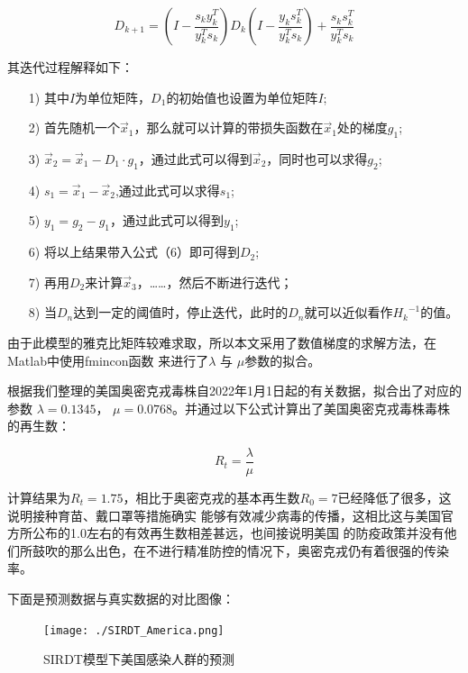 \documentclass[bwprint]{gmcmthesis}
\numberwithin{figure}{section}
\begin{document}
\begin{equation} \label{}
    D_{k+1}=\left( I-\frac{s_ky_{k}^{T}}{y_{k}^{T}s_k} \right) D_k\left( I-\dfrac{y_ks_{k}^{T}}{y_{k}^{T}s_k} \right) +\dfrac{s_ks_{k}^{T}}{y_{k}^{T}s_k}
\end{equation}

\par 其迭代过程解释如下：

\begin{itemize}
    \item[1)] 其中$I$为单位矩阵，$D_1$的初始值也设置为单位矩阵$I$;
    \item[2)] 首先随机一个$\vec{x}_1$，那么就可以计算的带损失函数在$\vec{x}_1$处的梯度$g_1$;
    \item[3)] $\vec{x}_2=\vec{x}_1-D_1\cdot g_1$，通过此式可以得到$\vec{x}_2$，同时也可以求得$g_2$;
    \item[4)] $s_1=\vec{x}_1-\vec{x}_2$,通过此式可以求得$s_1$;
    \item[5)] $y_1=g_2-g_1$，通过此式可以得到$y_1$;
    \item[6)] 将以上结果带入公式（6）即可得到$D_2$;
    \item[7)] 再用$D_2$来计算$\vec{x}_3$，……，然后不断进行迭代；
    \item[8)] 当$D_n$达到一定的阈值时，停止迭代，此时的$D_n$就可以近似看作${H_k}^{-1}$的值。
\end{itemize}

\par 由于此模型的雅克比矩阵较难求取，所以本文采用了数值梯度的求解方法，在Matlab中使用fmincon函数
来进行了$\lambda$ 与 $\mu$参数的拟合。

\par 根据我们整理的美国奥密克戎毒株自2022年1月1日起的有关数据，拟合出了对应的参数
$\lambda = 0.1345$， $\mu = 0.0768$。并通过以下公式计算出了美国奥密克戎毒株毒株的再生数：

\begin{equation}
    R_t=\dfrac{\lambda}{\mu}
\end{equation}

\par 计算结果为$R_t=1.75$，相比于奥密克戎的基本再生数$R_0=7$已经降低了很多，这说明接种育苗、戴口罩等措施确实
能够有效减少病毒的传播，这相比这与美国官方所公布的1.0左右的有效再生数相差甚远，也间接说明美国
的防疫政策并没有他们所鼓吹的那么出色，在不进行精准防控的情况下，奥密克戎仍有着很强的传染率。
\par 下面是预测数据与真实数据的对比图像：

\begin{figure}[!h]
    \centering
    \texttt{[image: ./SIRDT\_America.png]}
    \caption{SIRDT模型下美国感染人群的预测}
    \label{fig1}
\end{figure}
\end{document}
